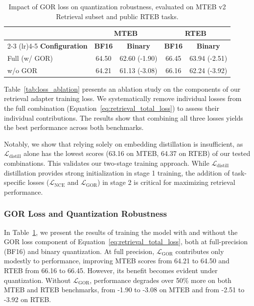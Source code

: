 \documentclass[11pt]{article}
\begin{document}
\begin{table}[t]
\centering
\caption{Impact of GOR loss on quantization robustness, evaluated on MTEB v2 Retrieval subset and public RTEB tasks.}
\label{tab:gor_quantization}
\small
\setlength{\tabcolsep}{3pt}
\begin{tabular}{@{}lcccc@{}}
\toprule
 & \multicolumn{2}{c}{\textbf{MTEB}} & \multicolumn{2}{c}{\textbf{RTEB}} \\
\cmidrule(lr){2-3} \cmidrule(lr){4-5}
\textbf{Configuration} & \textbf{BF16} & \textbf{Binary} & \textbf{BF16} & \textbf{Binary} \\
\midrule
Full (w/ GOR) & 64.50 & 62.60 (-1.90) & 66.45 & 63.94 (-2.51) \\
w/o GOR & 64.21 & 61.13 (-3.08) & 66.16 & 62.24 (-3.92) \\
\bottomrule
\end{tabular}
\vspace{2pt}
\end{table}

Table~\ref{tab:loss_ablation} presents an ablation study on the components of our retrieval adapter training loss. We systematically remove individual losses from the full combination (Equation~\ref{eq:retrieval_total_loss}) to assess their individual contributions. The results show that combining all three losses yields the best performance across both benchmarks. 

Notably, we show that relying solely on embedding distillation is insufficient, as  $\mathcal{L}_{\text{distill}}$ alone has the lowest scores (63.16 on MTEB, 64.37 on RTEB) of our tested combinations. This validates our two-stage training approach. While $\mathcal{L}_{\text{distill}}$ distillation provides strong initialization in stage 1 training, the addition of task-specific losses ($\mathcal{L}_{\text{NCE}}$ and $\mathcal{L}_\text{GOR}$) in stage 2 is critical for maximizing retrieval performance.


\subsubsection{GOR Loss and Quantization Robustness}
\label{sec:eval:gor-quantization}

In Table~\ref{tab:gor_quantization}, we present the results of training the model with and without the GOR loss component of Equation~\ref{eq:retrieval_total_loss}, both at full-precision (BF16) and binary quantization. At full precision, $\mathcal{L}_\text{GOR}$ contributes only modestly to performance, improving MTEB scores from 64.21 to 64.50 and RTEB from 66.16 to 66.45. However, its benefit becomes evident under quantization. Without $\mathcal{L}_\text{GOR}$, performance degrades over 50\% more on both MTEB and RTEB benchmarks, from -1.90 to -3.08 on MTEB and from -2.51 to -3.92 on RTEB.
\end{document}
